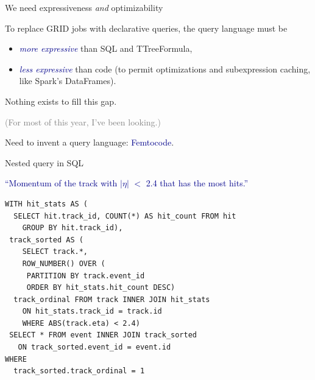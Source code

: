 \documentclass{beamer}
\begin{document}
\begin{frame}{We need expressiveness {\it and} optimizability}
\vspace{0.5 cm}
\begin{center}
\begin{minipage}{0.9\linewidth}
To replace GRID jobs with declarative queries, the query \mbox{language} must be
\begin{itemize}
\item \textcolor{darkblue}{\it more expressive} than SQL and TTreeFormula,
\item \textcolor{darkblue}{\it less expressive} than code (to permit optimizations and subexpression caching, like Spark's DataFrames).
\end{itemize}

\vspace{0.5 cm}
Nothing exists to fill this gap.

\textcolor{gray}{(For most of this year, I've been looking.)}

\vspace{0.5 cm}
Need to invent a query language: \textcolor{darkblue}{Femtocode}.
\end{minipage}
\end{center}
\end{frame}

\begin{frame}[fragile]{Nested query in SQL}
\vspace{0.25 cm}
\begin{center}
\begin{minipage}{0.95\linewidth}
\textcolor{darkblue}{``Momentum of the track with $|\eta|$ $<$ 2.4 that has the most hits.''}
\end{minipage}
\end{center}
\small
\begin{verbatim}
WITH hit_stats AS (
  SELECT hit.track_id, COUNT(*) AS hit_count FROM hit
    GROUP BY hit.track_id),
 track_sorted AS (
    SELECT track.*, 
    ROW_NUMBER() OVER (
     PARTITION BY track.event_id
     ORDER BY hit_stats.hit_count DESC)
  track_ordinal FROM track INNER JOIN hit_stats
    ON hit_stats.track_id = track.id
    WHERE ABS(track.eta) < 2.4)
 SELECT * FROM event INNER JOIN track_sorted
   ON track_sorted.event_id = event.id
WHERE
  track_sorted.track_ordinal = 1
\end{verbatim}
\end{frame}
\end{document}
